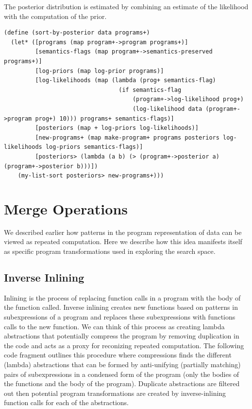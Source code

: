 \documentclass[a4paper,10pt]{article}
\begin{document}
The posterior distribution is estimated by combining an estimate of the likelihood with the computation of the prior.  
\begin{lstlisting}[frame=trBL]
(define (sort-by-posterior data programs+)
  (let* ([programs (map program+->program programs+)]
         [semantics-flags (map program+->semantics-preserved programs+)]
         [log-priors (map log-prior programs)]
         [log-likelihoods (map (lambda (prog+ semantics-flag)
                                 (if semantics-flag
                                     (program+->log-likelihood prog+)
                                     (log-likelihood data (program+->program prog+) 10))) programs+ semantics-flags)]
         [posteriors (map + log-priors log-likelihoods)] 
         [new-programs+ (map make-program+ programs posteriors log-likelihoods log-priors semantics-flags)]
         [posteriors> (lambda (a b) (> (program+->posterior a) (program+->posterior b)))])
    (my-list-sort posteriors> new-programs+)))
\end{lstlisting}
\section{Merge Operations}
We described earlier how patterns in the program representation of data can be viewed as repeated computation.  Here we describe how this idea manifests itself as specific program transformations used in exploring the search space.

\subsection{Inverse Inlining}
Inlining is the process of replacing function calls in a program with the body of the function called.  Inverse inlining creates new functions based on patterns in subexpressions of a program and replaces these subexpressions with functions calls to the new function.  We can think of this process as creating lambda abstractions that potentially compress the program by removing duplication in the code and acts as a proxy for reconizing repeated computation.  The following code fragment outlines this procedure where compressions finds the different (lambda) abstractions that can be formed by anti-unifying (partially matching) pairs of subexpressions in a condensed form of the program (only the bodies of the functions and the body of the program).  Duplicate abstractions are filtered out then potential program transformations are created by inverse-inlining function calls for each of the abstractions.  
\end{document}
